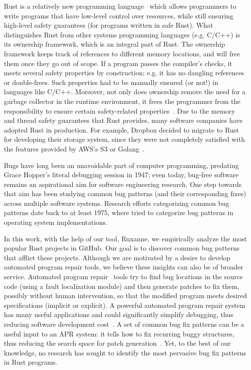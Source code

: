 Rust is a relatively new programming language~\citep{klabnik2019rust} which allows programmers to write programs that have low-level control over resources, while still ensuring high-level safety guarantees (for programs written in safe Rust). What distinguishes Rust from other systems programming languages (e.g. C/C++) is its ownership framework, which is an integral part of Rust. The ownership framework keeps track of references to different memory locations, and will free them once they go out of scope. If a program passes the compiler’s checks, it meets several safety properties by construction; e.g. it has no dangling references or double-frees. Such properties had to be manually ensured (or not!) in languages like C/C++. Moreover, not only does ownership remove the need for a garbage collector in the runtime environment, it frees the programmer from the responsibility to ensure certain safety-related properties~\citep{qin2020understanding}. Due to the memory and thread safety guarantees that Rust provides, many software companies have adopted Rust in production. For example, Dropbox decided to migrate to Rust for developing their storage system, since they were not completely satisfied with the features provided by AWS’s S3 or Golang~\citep{dropbox}.

Bugs have long been an unavoidable part of computer programming, predating Grace Hopper's literal debugging session in 1947; even today, bug-free software remains an aspirational aim for software engineering research. One step towards that aim has been studying common bug patterns (and their corresponding fixes) across multiple software systems. Research efforts categorizing common bug patterns date back to at least 1975, where \cite{endres1975analysis} tried to categorize bug patterns in operating system implementations.  

In this work, with the help of our tool, Ruxanne, we empirically analyze the most popular Rust projects in GitHub. Our goal is to discover common bug patterns that afflict these projects. Although we are motivated by a desire to develop automated program repair tools, we believe these insights can also be of broader service. Automated program repair~\citep{goues2019automated,liu2018survey} tools try to find bug locations in the source code (using a fault localization module) and then generate patches to fix them, possibly without human intervention, so that the modified program meets desired specifications (implicit or explicit). A powerful automated program repair system has many useful applications and could significantly simplify debugging, thus reducing software development cost~\citep{le2012systematic}. A set of common bug fix patterns can be a useful input to an APR system: it tells how to fix recurring buggy structures, thus reducing the search space for patch generation~\citep{jeffrey2009bugfix}. 
Yet, to the best of our knowledge, no research has sought to identify the most pervasive bug fix patterns in Rust programs.

